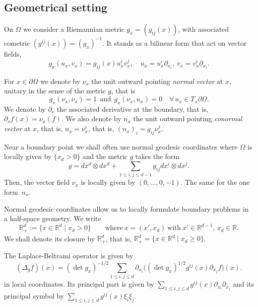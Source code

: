 \documentclass[JEP,XML,SOM,Unicode,published]{cedram}
\let\sep\mid
\theoremstyle{plain}
\theoremstyle{definition}
\def\R{\mathbb{R}}
\newcommand{\ovl}[1]{\overline{#1}}
\newcommand{\Rdp}{\R^d_+}
\begin{document}
\subsection{Geometrical setting}
\label{sec: Geometrical setting}

On $\Omega$ we consider a Riemannian metric $g_x = (g_{ij}(x))$, with
associated cometric $(g^{ij}(x)) = (g_x)^{-1}$.
It stands as a bilinear form that act on vector fields,
\[
g_x (u_x, v_x) = g_{ij}(x) u_x^i v_x^j,
\quad u_x = u_x^i \partial_{x_i}, \
v_x = v_x^i \partial_{x_i}.
\]

For $x \in \partial \Omega$ we denote by $\nu_x$ the unit outward
pointing \emph{normal vector} at $x$, unitary in the sense of the
metric $g$, that is
\begin{equation*}
g_x(\nu_x, \nu_x)=1
\ \ \text{and} \ \
g_x(\nu_x, u_x)=0 \quad \forall\,u_x \in T_x \partial \Omega.
\end{equation*}
We denote by $\partial_\nu$ the associated derivative at the boundary,
that is, $\partial_\nu f (x) = \nu_x (f)$.
We also denote by $n_x$ the unit outward
pointing \emph{conormal vector} at $x$, that is,
$n_x = \nu_x^\flat$, that is, $(n_x)_i = g_{i j} \nu_x^j$.

Near a boundary point we shall often use normal geodesic coordinates
where $\Omega$ is locally given by $\{ x_d >0\}$ and the
metric $g$ takes the form
\begin{equation*}
g=dx^d\otimes dx^d
+\sum_{1\leq i,j\leq d-1} g_{ij} dx^i\otimes dx^j.
\end{equation*}
Then, the vector field $\nu_x$ is locally given by $(0, \dots, 0,
-1)$. The same for the one form~$n_x$.

Normal geodesic coordinates allow us to locally formulate
boundary problems in a half-space geometry. We write
\[
\Rdp:=\{ x\in\R^d\sep x_d>0\}\qquad \text{where}\
x=(x',x_d) \ \text{with}\ x'\in\R^{d-1},\, x_d\in\R.
\]
We shall denote its closure by $\ovl{\Rdp}$, that is,
$\ovl{\Rdp} = \{ x\in \R^d\sep x_d\geq 0\}$.

The Laplace-Beltrami operator
is given by
\begin{equation}
\label{eq: laplace-Beltrami}
(\Delta_g f) (x) =(\det g_x)^{-1/2}
\sum_{1\leq i, j\leq d} \partial_{x_i}\big((\det g_x)^{1/2} g^{i j}(x)
\partial_{x_j} f \big)(x).
\end{equation}
in local coordinates. Its principal part is given by
$\sum_{1\leq i, j\leq d} g^{i j}(x) \partial_{x_i} \partial_{x_j}$ and
its principal symbol by $\sum_{1\leq i, j\leq d} g^{i j}(x) \xi_i
\xi_j$.
\end{document}
